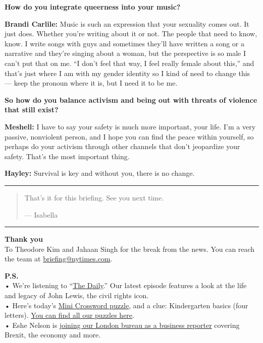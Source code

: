 \textbf{How do you integrate queerness into your music?}

\textbf{Brandi Carlile:} Music is such an expression that your sexuality
comes out. It just does. Whether you're writing about it or not. The
people that need to know, know. I write songs with guys and sometimes
they'll have written a song or a narrative and they're singing about a
woman, but the perspective is so male I can't put that on me. ``I don't
feel that way, I feel really female about this,'' and that's just where
I am with my gender identity so I kind of need to change this --- keep
the pronoun where it is, but I need it to be me.

\textbf{So how do you balance activism and being out with threats of
violence that still exist?}

\textbf{Meshell:} I have to say your safety is much more important, your
life. I'm a very passive, nonviolent person, and I hope you can find the
peace within yourself, so perhaps do your activism through other
channels that don't jeopardize your safety. That's the most important
thing.

\textbf{Hayley:} Survival is key and without you, there is no change.

\begin{center}\rule{0.5\linewidth}{\linethickness}\end{center}

\begin{quote}
That's it for this briefing. See you next time.

--- Isabella
\end{quote}

\begin{center}\rule{0.5\linewidth}{\linethickness}\end{center}

\textbf{Thank you}\\
To Theodore Kim and Jahaan Singh for the break from the news. You can
reach the team at
\href{mailto:briefing+midnight@nytimes.com?subject=Briefing\%20Feedback}{briefing@nytimes.com}.

\textbf{P.S.}\\
• We're listening to ``\href{https://www.nytimes.com/thedaily}{The
Daily}.'' Our latest episode features a look at the life and legacy of
John Lewis, the civil rights icon.\\
• Here's today's
\href{https://www.nytimes.com/crosswords/game/mini}{Mini Crossword
puzzle}, and a clue: Kindergarten basics (four letters).
\href{https://www.nytimes.com/crosswords}{You can find all our puzzles
here}.\\
• Eshe Nelson is
\href{https://www.nytco.com/press/new-business-reporter-in-london/}{joining
our London bureau as a business reporter} covering Brexit, the economy
and more.

